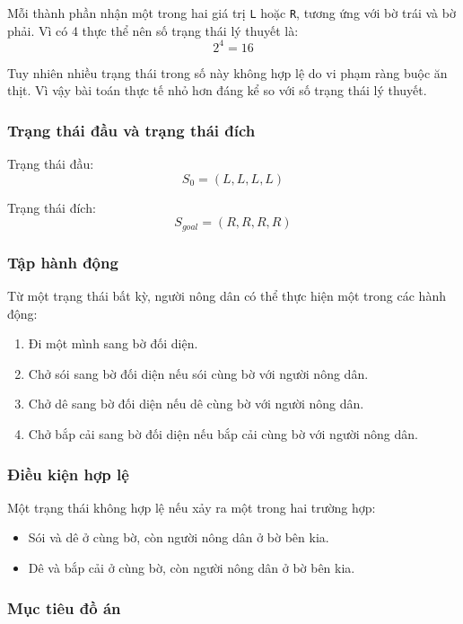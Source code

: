 \documentclass[a4paper,12pt]{article}
\begin{document}
Mỗi thành phần nhận một trong hai giá trị \texttt{L} hoặc \texttt{R}, tương ứng với bờ trái và bờ phải. Vì có 4 thực thể nên số trạng thái lý thuyết là:
\[
2^4 = 16
\]

Tuy nhiên nhiều trạng thái trong số này không hợp lệ do vi phạm ràng buộc ăn thịt. Vì vậy bài toán thực tế nhỏ hơn đáng kể so với số trạng thái lý thuyết.

\subsubsection{Trạng thái đầu và trạng thái đích}

Trạng thái đầu:
\[
S_0 = (L, L, L, L)
\]

Trạng thái đích:
\[
S_{goal} = (R, R, R, R)
\]

\subsubsection{Tập hành động}

Từ một trạng thái bất kỳ, người nông dân có thể thực hiện một trong các hành động:
\begin{enumerate}
    \item Đi một mình sang bờ đối diện.
    \item Chở sói sang bờ đối diện nếu sói cùng bờ với người nông dân.
    \item Chở dê sang bờ đối diện nếu dê cùng bờ với người nông dân.
    \item Chở bắp cải sang bờ đối diện nếu bắp cải cùng bờ với người nông dân.
\end{enumerate}

\subsubsection{Điều kiện hợp lệ}

Một trạng thái không hợp lệ nếu xảy ra một trong hai trường hợp:
\begin{itemize}
    \item Sói và dê ở cùng bờ, còn người nông dân ở bờ bên kia.
    \item Dê và bắp cải ở cùng bờ, còn người nông dân ở bờ bên kia.
\end{itemize}

\subsubsection{Mục tiêu đồ án}
\end{document}
